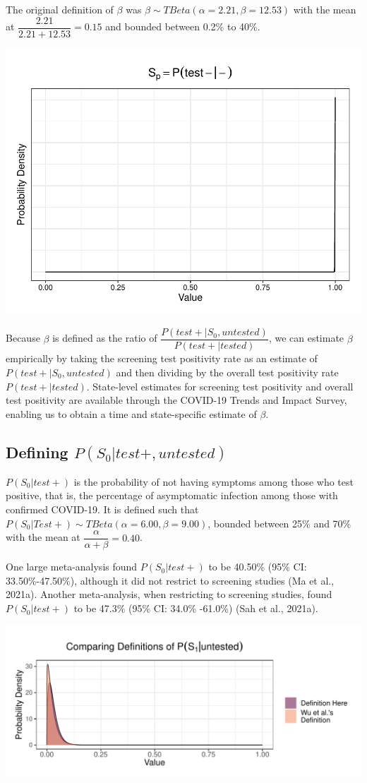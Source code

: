 \documentclass[12pt,twoside]{smiththesis}
\begin{document}
The original definition of \(\beta\) was
\(\beta \sim TBeta(\alpha = 2.21, \beta = 12.53)\) with the mean at \(\dfrac{2.21}{2.21 + 12.53} = 0.15\) and bounded between 0.2\% to 40\%.
\begin{center}\includegraphics[width=0.5\linewidth]{thesis_files/figure-latex/unnamed-chunk-54-1} \end{center}

Because \(\beta\) is defined as the ratio of \(\dfrac{P(test + |S_0, untested)}{P(test+|tested)}\), we can estimate \(\beta\) empirically by taking the screening test positivity rate as an estimate of \(P(test + |S_0, untested)\) and then dividing by the overall test positivity rate \(P(test+|tested)\). State-level estimates for screening test positivity and overall test positivity are available through the COVID-19 Trends and Impact Survey, enabling us to obtain a time and state-specific estimate of \(\beta\).

\hypertarget{defining-ps_0testuntested}{%
\subsection{\texorpdfstring{Defining \(P(S_0|test+,untested)\)}{Defining P(S\_0\textbar test+,untested)}}\label{defining-ps_0testuntested}}

\(P(S_0|test +)\) is the probability of not having symptoms among those who test positive, that is, the percentage of asymptomatic infection among those with confirmed COVID-19. It is defined such that \(P(S_0|Test +) \sim TBeta(\alpha = 6.00, \beta = 9.00)\), bounded between 25\% and 70\% with the mean at \(\dfrac{\alpha}{\alpha + \beta} = 0.40\).

One large meta-analysis found \(P(S_0|test+)\) to be 40.50\% (95\% CI: 33.50\%-47.50\%), although it did not restrict to screening studies (Ma et al., 2021a). Another meta-analysis, when restricting to screening studies, found \(P(S_0|test+)\) to be 47.3\% (95\% CI: 34.0\% -61.0\%) (Sah et al., 2021a).
\begin{center}\includegraphics[width=0.5\linewidth]{thesis_files/figure-latex/unnamed-chunk-55-1} \end{center}
\end{document}
